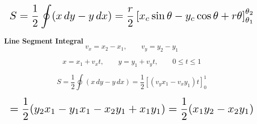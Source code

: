 \[
\resizebox{\linewidth}{!}{$\displaystyle
S
=
\frac{1}{2}\oint (x\,dy-y\,dx)
=
\frac{r}{2}
\left[
x_c\sin\theta-y_c\cos\theta+r\theta
\right]_{\theta_1}^{\theta_2}
$}
\]

\vspace{5pt}
\noindent \textbf{Line Segment Integral} \\
\[
v_x=x_2-x_1,\qquad v_y=y_2-y_1
\]

\[
x=x_1+v_x t,\qquad y=y_1+v_y t,\qquad 0\le t\le 1
\]

\[
S
=
\frac{1}{2}\oint (x\,dy-y\,dx)
=
\frac{1}{2}
\left[
(v_yx_1-v_xy_1)t
\right]_0^1
\]

\[
\resizebox{\linewidth}{!}{$\displaystyle
=
\frac{1}{2}
(y_2x_1-y_1x_1-x_2y_1+x_1y_1)
=
\frac{1}{2}(x_1y_2-x_2y_1)
$}
\]
